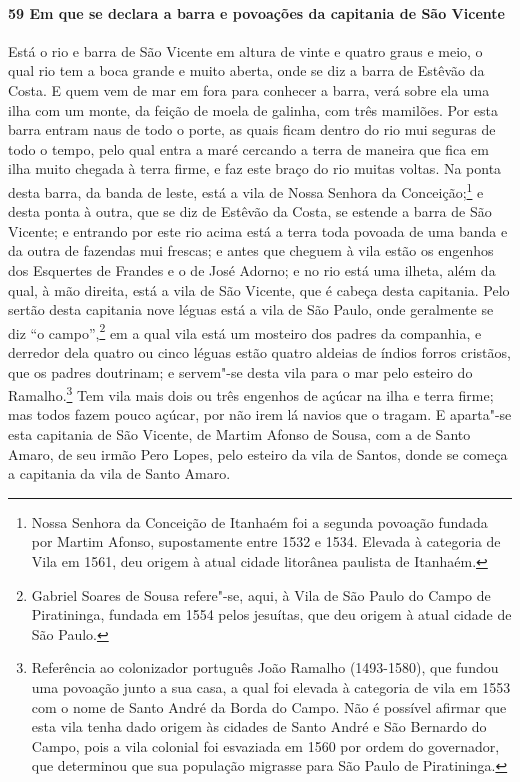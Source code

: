 \begin{linenumbers}
\paragraph{59 Em que se declara a barra e povoações da capitania de São Vicente} \quad
Está o rio e barra de São Vicente em altura de vinte e quatro graus e meio, o qual rio tem
a boca grande e muito aberta, onde se diz a barra de Estêvão da Costa. E quem vem de mar
em fora para conhecer a barra, verá sobre ela uma ilha com um monte, da feição de moela de
galinha, com três mamilões. Por esta barra entram naus de todo o porte, as quais ficam
dentro do rio mui seguras de todo o tempo, pelo qual entra a maré cercando a terra de
maneira que fica em ilha muito chegada à terra firme, e faz este braço do rio muitas
voltas. Na ponta desta barra, da banda de leste, está a vila de Nossa Senhora da
Conceição;\footnote{ Nossa Senhora da Conceição de Itanhaém foi a segunda povoação fundada
por Martim Afonso, supostamente entre 1532 e 1534. Elevada à categoria de Vila em 1561,
deu origem à atual cidade litorânea paulista de Itanhaém.} e desta ponta à outra, que se
diz de Estêvão da Costa, se estende a barra de São Vicente; e entrando por este rio acima
está a terra toda povoada de uma banda e da outra de fazendas mui frescas; e antes que
cheguem à vila estão os engenhos dos Esquertes de Frandes e o de José Adorno; e no rio
está uma ilheta, além da qual, à mão direita, está a vila de São Vicente, que é cabeça
desta capitania. Pelo sertão desta capitania nove léguas está a vila de São Paulo, onde
geralmente se diz ``o campo'',\footnote{ Gabriel Soares de Sousa refere"-se, aqui, à Vila de
São Paulo do Campo de Piratininga, fundada em 1554 pelos jesuítas, que deu origem à atual
cidade de São Paulo.} em a qual vila está um mosteiro dos padres da companhia, e derredor
dela quatro ou cinco léguas estão quatro aldeias de índios forros cristãos, que os padres
doutrinam; e servem"-se desta vila para o mar pelo esteiro do Ramalho.\footnote{ Referência
ao colonizador português João Ramalho (1493-1580), que fundou uma povoação junto a sua
casa, a qual foi elevada à categoria de vila em 1553 com o nome de Santo André da Borda do
Campo. Não é possível afirmar que esta vila tenha dado origem às cidades de Santo André e
São Bernardo do Campo, pois a vila colonial foi esvaziada em 1560 por ordem do
governador, que determinou que sua população migrasse para São Paulo de Piratininga.}
Tem vila mais dois ou três engenhos de açúcar na ilha e terra firme; mas todos fazem pouco
açúcar, por não irem lá navios que o tragam. E aparta"-se esta capitania de São Vicente, de
Martim Afonso de Sousa, com a de Santo Amaro, de seu irmão Pero Lopes, pelo esteiro da
vila de Santos, donde se começa a capitania da vila de Santo Amaro.


\end{linenumbers}
